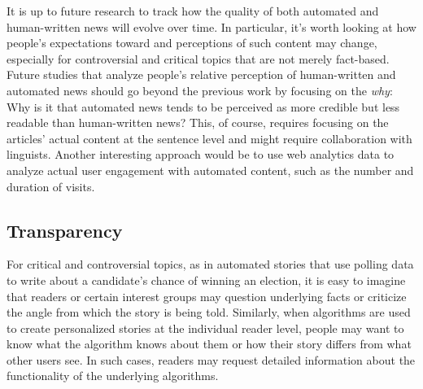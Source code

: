 \documentclass[notoc, symmetric, nobib, nols]{towcenter-book}
\begin{document}
It is up to future research to track how the quality of both automated and human-written news will evolve over time. In particular, it’s worth looking at how people’s expectations toward and perceptions of such content may change, especially for controversial and critical topics that are not merely fact-based. Future studies that analyze people’s relative perception of human-written and automated news should go beyond the previous work by focusing on the \textit{why}: Why is it that automated news tends to be perceived as more credible but less readable than human-written news? This, of course, requires focusing on the articles’ actual content at the sentence level and might require collaboration with linguists. Another interesting approach would be to use web analytics data to analyze actual user engagement with automated content, such as the number and duration of visits.

\subsection{Transparency} 

For critical and controversial topics, as in automated stories that use polling data to write about a candidate’s chance of winning an election, it is easy to imagine that readers or certain interest groups may question underlying facts or criticize the angle from which the story is being told. Similarly, when algorithms are used to create personalized stories at the individual reader level, people may want to know what the algorithm knows about them or how their story differs from what other users see. In such cases, readers may request detailed information about the functionality of the underlying algorithms. 
\end{document}
